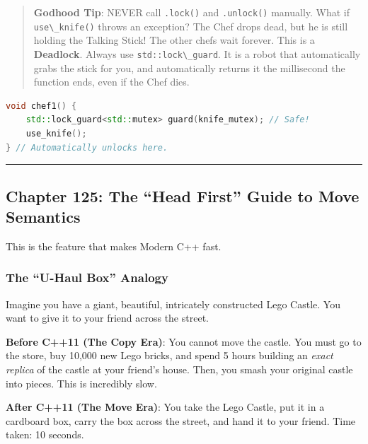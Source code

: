 \begin{quote}
\textbf{Godhood Tip}: NEVER call \passthrough{\lstinline!.lock()!} and
\passthrough{\lstinline!.unlock()!} manually. What if
\passthrough{\lstinline!use\_knife()!} throws an exception? The Chef
drops dead, but he is still holding the Talking Stick! The other chefs
wait forever. This is a \textbf{Deadlock}. Always use
\passthrough{\lstinline!std::lock\_guard!}. It is a robot that
automatically grabs the stick for you, and automatically returns it the
millisecond the function ends, even if the Chef dies.
\end{quote}

\begin{lstlisting}[language={C++}]
void chef1() {
    std::lock_guard<std::mutex> guard(knife_mutex); // Safe!
    use_knife();
} // Automatically unlocks here.
\end{lstlisting}

\begin{center}\rule{0.5\linewidth}{0.5pt}\end{center}

\hypertarget{chapter-125-the-head-first-guide-to-move-semantics}{%
\subsection{Chapter 125: The ``Head First'' Guide to Move
Semantics}\label{chapter-125-the-head-first-guide-to-move-semantics}}

This is the feature that makes Modern C++ fast.

\hypertarget{the-u-haul-box-analogy}{%
\subsubsection{The ``U-Haul Box''
Analogy}\label{the-u-haul-box-analogy}}

Imagine you have a giant, beautiful, intricately constructed Lego
Castle. You want to give it to your friend across the street.

\textbf{Before C++11 (The Copy Era)}: You cannot move the castle. You
must go to the store, buy 10,000 new Lego bricks, and spend 5 hours
building an \emph{exact replica} of the castle at your friend's house.
Then, you smash your original castle into pieces. This is incredibly
slow.

\textbf{After C++11 (The Move Era)}: You take the Lego Castle, put it in
a cardboard box, carry the box across the street, and hand it to your
friend. Time taken: 10 seconds.

